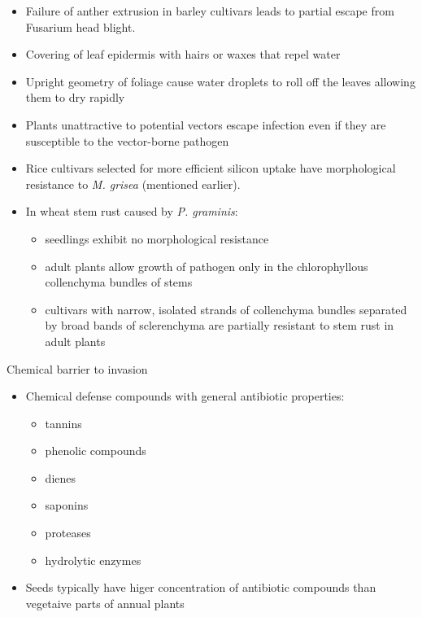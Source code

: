 \documentclass[11pt,dvipsnames,ignorenonframetext,aspectratio=169]{beamer}
\providecommand{\tightlist}{%
  \setlength{\itemsep}{0pt}\setlength{\parskip}{0pt}}
\begin{document}
\begin{frame}{}
\protect\hypertarget{section-19}{}
\begin{itemize}
\tightlist
\item
  Failure of anther extrusion in barley cultivars leads to partial
  escape from Fusarium head blight.
\item
  Covering of leaf epidermis with hairs or waxes that repel water
\item
  Upright geometry of foliage cause water droplets to roll off the
  leaves allowing them to dry rapidly
\item
  Plants unattractive to potential vectors escape infection even if they
  are susceptible to the vector-borne pathogen
\item
  Rice cultivars selected for more efficient silicon uptake have
  morphological resistance to \textit{M. grisea} (mentioned earlier).
\item
  In wheat stem rust caused by \textit{P. graminis}:

  \begin{itemize}
  \tightlist
  \item
    seedlings exhibit no morphological resistance
  \item
    adult plants allow growth of pathogen only in the chlorophyllous
    collenchyma bundles of stems
  \item
    cultivars with narrow, isolated strands of collenchyma bundles
    separated by broad bands of sclerenchyma are partially resistant to
    stem rust in adult plants
  \end{itemize}
\end{itemize}
\end{frame}

\begin{frame}{Chemical barrier to invasion}
\protect\hypertarget{chemical-barrier-to-invasion}{}
\begin{itemize}
\tightlist
\item
  Chemical defense compounds with general antibiotic properties:

  \begin{itemize}
  \tightlist
  \item
    tannins
  \item
    phenolic compounds
  \item
    dienes
  \item
    saponins
  \item
    proteases
  \item
    hydrolytic enzymes
  \end{itemize}
\item
  Seeds typically have higer concentration of antibiotic compounds than
  vegetaive parts of annual plants
\end{itemize}
\end{frame}
\end{document}
